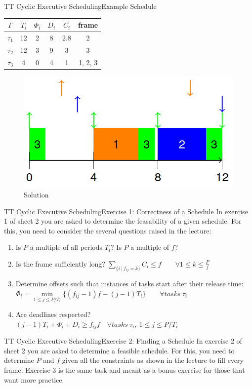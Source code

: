 \begin{frame}{TT Cyclic Executive Scheduling}{Example Schedule}
\begin{center}
    \begin{tabular}{|c||c|c|c|c|c|}
    \hline
    $\Gamma$ & $T_i$ & $\Phi_i$ & $D_i$ & $C_i$ & frame\\
    \hline
    $\tau_1$ & 12 & 2 & 8 & 2.8 & 2\\
    \hline
    $\tau_2$ & 12 & 3 & 9 & 3 & 3\\
    \hline
    $\tau_3$ & 4 & 0 & 4 & 1 & 1, 2, 3\\
    \hline
\end{tabular}
\end{center}
\begin{figure}
    \centering
    \includegraphics[scale=0.25]{figures/schedule_example.png}
    \caption{Solution}
    \label{exampleSolution}
\end{figure}
\end{frame}

\begin{frame}{TT Cyclic Executive Scheduling}{Exercise 1: Correctness of a Schedule}
In exercise 1 of sheet 2 you are asked to determine the feasability of a given schedule. For this, you need to consider the several questions raised in the lecture:
\begin{enumerate}
    \item Is $P$ a multiple of all periods $T_i$? Is $P$ a multiple of $f$?
    \item Is the frame sufficiently long? $\sum\limits_{\{i\ |\ f_{ij}=k\}}C_i \leq f \qquad \forall 1 \leq k \leq \frac{P}{f}$
    \item Determine offsets such that instances of tasks start after their release time: $\Phi_i = \min\limits_{1\leq j\leq P/T_i} \{(f_{ij}-1)f-(j-1)T_i\} \qquad \forall tasks \ \tau_i$
    \item Are deadlines respected? $(j-1)T_i + \Phi_i + D_i \geq f_{ij}f \quad \forall tasks\ \tau_i,\ 1 \leq j \leq P/T_i$
\end{enumerate}
\end{frame}

\begin{frame}{TT Cyclic Executive Scheduling}{Exercise 2: Finding a Schedule}
In exercise 2 of sheet 2 you are asked to determine a feasible schedule. For this, you need to determine $P$ and $f$ given all the constraints as shown in the lecture to fill every frame. Exercise 3 is the same task and meant as a bonus exercise for those that want more practice.
\end{frame}